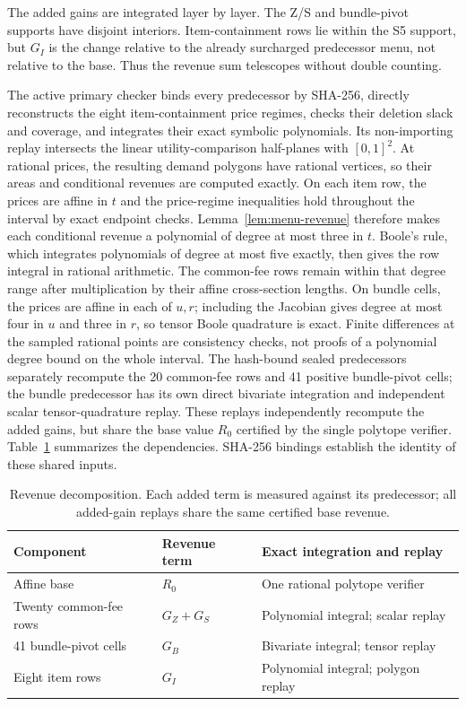 \documentclass[11pt]{article}
\begin{document}
The added gains are integrated layer by layer.  The Z/S and bundle-pivot
supports have disjoint interiors.  Item-containment rows lie within the
S5 support, but \(G_I\) is the change relative to the already surcharged
predecessor menu, not relative to the base.  Thus the revenue sum telescopes
without double counting.

The active primary checker binds every predecessor by SHA-256, directly
reconstructs the eight
item-containment price regimes, checks their deletion slack and coverage, and
integrates their exact symbolic polynomials.  Its non-importing replay
intersects the linear utility-comparison half-planes with \([0,1]^2\).
At rational prices, the resulting demand polygons have rational vertices,
so their areas and conditional revenues are computed exactly.  On each item
row, the prices are affine in \(t\) and the
price-regime inequalities hold throughout the interval by exact endpoint
checks.  Lemma~\ref{lem:menu-revenue} therefore makes each conditional revenue
a polynomial of degree at most three in \(t\).  Boole's rule, which integrates
polynomials of degree at most five exactly, then gives the row integral in
rational arithmetic.  The common-fee rows remain within that degree range
after multiplication by their affine cross-section lengths.  On bundle cells,
the prices are affine in each of \(u,r\); including the Jacobian gives degree
at most four in \(u\) and three in \(r\), so tensor Boole quadrature is exact.
Finite differences at the sampled rational points are consistency checks,
not proofs of a polynomial degree bound on the whole interval.
The hash-bound sealed predecessors separately
recompute the 20 common-fee rows and 41 positive bundle-pivot cells; the bundle
predecessor has its own direct bivariate integration and independent scalar
tensor-quadrature replay.  These replays independently recompute the added
gains, but share the base value \(R_0\) certified by the single polytope
verifier.  Table~\ref{tab:lower-components} summarizes the dependencies.
SHA-256 bindings establish the identity of these shared inputs.

\begin{table}[ht]
\centering\small
\begin{tabular}{@{}lll@{}}
\toprule
Component & Revenue term & Exact integration and replay \\
\midrule
Affine base & \(R_0\) & One rational polytope verifier \\
Twenty common-fee rows & \(G_Z+G_S\) & Polynomial integral; scalar replay \\
41 bundle-pivot cells & \(G_B\) & Bivariate integral; tensor replay \\
Eight item rows & \(G_I\) & Polynomial integral; polygon replay \\
\bottomrule
\end{tabular}
\caption{Revenue decomposition.  Each added term is measured against its
predecessor; all added-gain replays share the same certified base revenue.}
\label{tab:lower-components}
\end{table}
\end{document}
